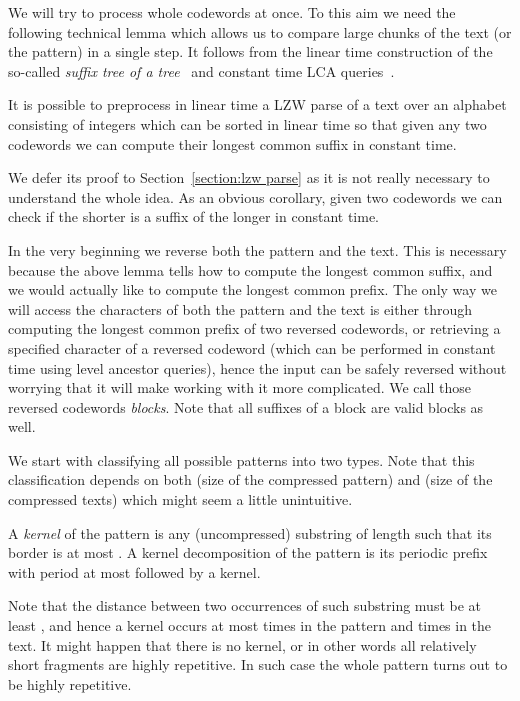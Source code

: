\documentclass[runningheads]{llncs}
\begin{document}
We will try to process whole codewords at once. To this aim we need the following technical lemma which allows us to compare large chunks of the text (or the pattern) in a single step. It follows from the linear time construction of the so-called {\it suffix tree of a tree}~\cite{ShibuyaTree} and constant time LCA queries~\cite{BenderLCA}.

\begin{lemma}
\label{lemma:parse preprocessing}
It is possible to preprocess in linear time a LZW parse of a text over an alphabet consisting of integers which can be sorted in linear time so that given any two codewords we can compute their longest common suffix in constant time.
\end{lemma}

We defer its proof to Section~\ref{section:lzw parse} as it is not really necessary to understand the whole idea. As an obvious corollary, given two codewords we can check if the shorter is a suffix of the longer in constant time.

In the very beginning we reverse both the pattern and the text. This is necessary because the above lemma tells how to compute the longest common suffix, and we would actually like to compute the longest common prefix. The only way we will access the characters of both the pattern and the text
is either through computing the longest common prefix of two reversed codewords, or retrieving a specified character of a reversed codeword (which can be performed in constant time using level ancestor queries), hence the input can be safely reversed without worrying that it will make working with it more complicated. We call those reversed codewords \emph{blocks}. Note that all suffixes of a block are valid blocks as well.

We start with classifying all possible patterns into two types. Note that this classification depends on both  (size of the compressed pattern) and  (size of the compressed texts) which might seem a little unintuitive.

\begin{definition}
A \emph{kernel} of the pattern is any (uncompressed) substring of length  such that its border is at most . A kernel decomposition of the pattern is its periodic prefix with period at most  followed by a kernel.
\end{definition}

Note that the distance between two occurrences of such substring must be at least , and hence a kernel occurs at most  times in the pattern and  times in the text. It might happen that there is no kernel, or in other words all relatively short fragments are highly repetitive. In such case the whole pattern turns out to be highly repetitive.
\end{document}
